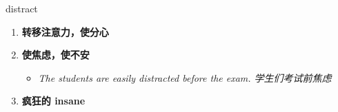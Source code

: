 
\begin{frame}
{\huge distract}
\begin{center}
\begin{enumerate}\Large
  \item \textbf{转移注意力，使分心}
  \item \textbf{使焦虑，使不安}
  \begin{itemize}
    \item \em{\Large{The students are easily distracted before the exam. 学生们考试前焦虑}}
  \end{itemize}
  \item \textbf{疯狂的 insane}
\end{enumerate}
\end{center}
\end{frame}
